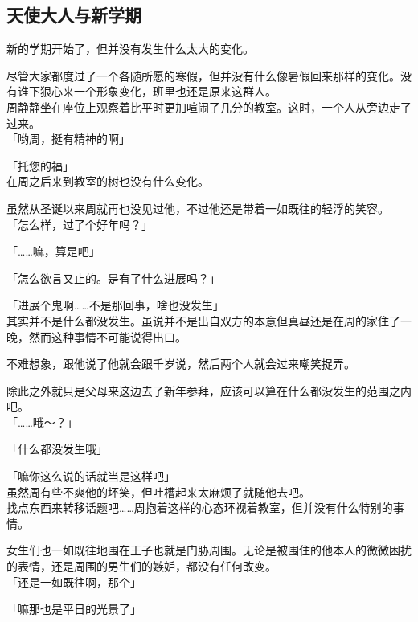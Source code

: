 \subsection{天使大人与新学期}

新的学期开始了，但并没有发生什么太大的变化。

尽管大家都度过了一个各随所愿的寒假，但并没有什么像暑假回来那样的变化。没有谁下狠心来一个形象变化，班里也还是原来这群人。\\

周静静坐在座位上观察着比平时更加喧闹了几分的教室。这时，一个人从旁边走了过来。\\

「哟周，挺有精神的啊」

「托您的福」\\

在周之后来到教室的树也没有什么变化。

虽然从圣诞以来周就再也没见过他，不过他还是带着一如既往的轻浮的笑容。\\

「怎么样，过了个好年吗？」

「……嘛，算是吧」

「怎么欲言又止的。是有了什么进展吗？」

「进展个鬼啊……不是那回事，啥也没发生」\\

其实并不是什么都没发生。虽说并不是出自双方的本意但真昼还是在周的家住了一晚，然而这种事情不可能说得出口。

不难想象，跟他说了他就会跟千岁说，然后两个人就会过来嘲笑捉弄。

除此之外就只是父母来这边去了新年参拜，应该可以算在什么都没发生的范围之内吧。\\

「……哦～？」

「什么都没发生哦」

「嘛你这么说的话就当是这样吧」\\

虽然周有些不爽他的坏笑，但吐槽起来太麻烦了就随他去吧。\\

找点东西来转移话题吧……周抱着这样的心态环视着教室，但并没有什么特别的事情。

女生们也一如既往地围在王子也就是门胁周围。无论是被围住的他本人的微微困扰的表情，还是周围的男生们的嫉妒，都没有任何改变。\\

「还是一如既往啊，那个」

「嘛那也是平日的光景了」\\

